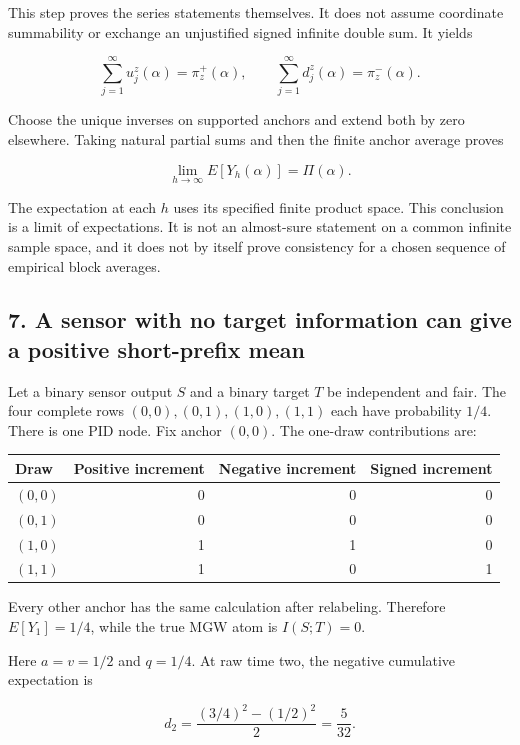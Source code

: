 This step proves the series statements themselves. It does not assume coordinate summability or exchange an unjustified signed infinite double sum. It yields

\[
\sum_{j=1}^{\infty}u_j^z(\alpha)=\pi_z^+(\alpha),
\qquad
\sum_{j=1}^{\infty}d_j^z(\alpha)=\pi_z^-(\alpha).
\]

Choose the unique inverses on supported anchors and extend both by zero elsewhere. Taking natural partial sums and then the finite anchor average proves

\[
\lim_{h\to\infty} E[Y_h(\alpha)]=\Pi(\alpha).
\]

The expectation at each \(h\) uses its specified finite product space. This conclusion is a limit of expectations. It is not an almost-sure statement on a common infinite sample space, and it does not by itself prove consistency for a chosen sequence of empirical block averages.

\subsection{7. A sensor with no target information can give a positive short-prefix mean}\label{a-sensor-with-no-target-information-can-give-a-positive-short-prefix-mean}

Let a binary sensor output \(S\) and a binary target \(T\) be independent and fair. The four complete rows \((0,0),(0,1),(1,0),(1,1)\) each have probability \(1/4\). There is one PID node. Fix anchor \((0,0)\). The one-draw contributions are:

{\def\LTcaptype{none} %
\begin{longtable}[]{@{}lrrr@{}}
\toprule\noalign{}
Draw & Positive increment & Negative increment & Signed increment \\
\midrule\noalign{}
\endhead
\bottomrule\noalign{}
\endlastfoot
\((0,0)\) & 0 & 0 & 0 \\
\((0,1)\) & 0 & 0 & 0 \\
\((1,0)\) & 1 & 1 & 0 \\
\((1,1)\) & 1 & 0 & 1 \\
\end{longtable}
}

Every other anchor has the same calculation after relabeling. Therefore \(E[Y_1]=1/4\), while the true MGW atom is \(I(S;T)=0\).

Here \(a=v=1/2\) and \(q=1/4\). At raw time two, the negative cumulative expectation is

\[
d_2=\frac{(3/4)^2-(1/2)^2}{2}=\frac5{32}.
\]

